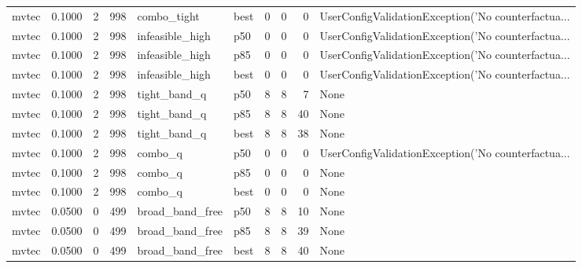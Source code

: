 \begin{tabular}{lrrrllrrrl}
   mvtec &    0.1000 &    2 &    998 &          combo\_tight &   best &               0 &          0 &       0 & UserConfigValidationException('No counterfactua... \\
   mvtec &    0.1000 &    2 &    998 &      infeasible\_high &    p50 &               0 &          0 &       0 & UserConfigValidationException('No counterfactua... \\
   mvtec &    0.1000 &    2 &    998 &      infeasible\_high &    p85 &               0 &          0 &       0 & UserConfigValidationException('No counterfactua... \\
   mvtec &    0.1000 &    2 &    998 &      infeasible\_high &   best &               0 &          0 &       0 & UserConfigValidationException('No counterfactua... \\
   mvtec &    0.1000 &    2 &    998 &         tight\_band\_q &    p50 &               8 &          8 &       7 &                                               None \\
   mvtec &    0.1000 &    2 &    998 &         tight\_band\_q &    p85 &               8 &          8 &      40 &                                               None \\
   mvtec &    0.1000 &    2 &    998 &         tight\_band\_q &   best &               8 &          8 &      38 &                                               None \\
   mvtec &    0.1000 &    2 &    998 &              combo\_q &    p50 &               0 &          0 &       0 & UserConfigValidationException('No counterfactua... \\
   mvtec &    0.1000 &    2 &    998 &              combo\_q &    p85 &               0 &          0 &       0 &                                               None \\
   mvtec &    0.1000 &    2 &    998 &              combo\_q &   best &               0 &          0 &       0 &                                               None \\
   mvtec &    0.0500 &    0 &    499 &      broad\_band\_free &    p50 &               8 &          8 &      10 &                                               None \\
   mvtec &    0.0500 &    0 &    499 &      broad\_band\_free &    p85 &               8 &          8 &      39 &                                               None \\
   mvtec &    0.0500 &    0 &    499 &      broad\_band\_free &   best &               8 &          8 &      40 &                                               None \\

\end{tabular}
